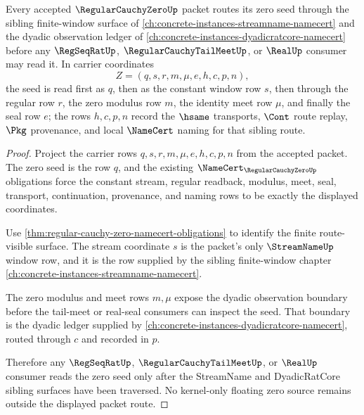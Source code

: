 \begin{theorem}
\label{thm:regular-cauchy-zero-streamname-dyadic-sibling-route}
Every accepted $\RegularCauchyZeroUp$ packet routes its zero seed through the sibling finite-window surface of \autoref{ch:concrete-instances-streamname-namecert} and the dyadic observation ledger of \autoref{ch:concrete-instances-dyadicratcore-namecert} before any $\RegSeqRatUp$, $\RegularCauchyTailMeetUp$, or $\RealUp$ consumer may read it. In carrier coordinates
$$
Z=(q,s,r,m,\mu,e,h,c,p,n),
$$
the seed is read first as $q$, then as the constant window row $s$, then through the regular row $r$, the zero modulus row $m$, the identity meet row $\mu$, and finally the seal row $e$; the rows $h,c,p,n$ record the $\hsame$ transports, $\Cont$ route replay, $\Pkg$ provenance, and local $\NameCert$ naming for that sibling route.
\end{theorem}
\begin{proof}
Project the carrier rows $q,s,r,m,\mu,e,h,c,p,n$ from the accepted packet. The zero seed is the row $q$, and the existing $\NameCert_{\RegularCauchyZeroUp}$ obligations force the constant stream, regular readback, modulus, meet, seal, transport, continuation, provenance, and naming rows to be exactly the displayed coordinates.

Use \autoref{thm:regular-cauchy-zero-namecert-obligations} to identify the finite route-visible surface. The stream coordinate $s$ is the packet's only $\StreamNameUp$ window row, and it is the row supplied by the sibling finite-window chapter \autoref{ch:concrete-instances-streamname-namecert}.

The zero modulus and meet rows $m,\mu$ expose the dyadic observation boundary before the tail-meet or real-seal consumers can inspect the seed. That boundary is the dyadic ledger supplied by \autoref{ch:concrete-instances-dyadicratcore-namecert}, routed through $c$ and recorded in $p$.

Therefore any $\RegSeqRatUp$, $\RegularCauchyTailMeetUp$, or $\RealUp$ consumer reads the zero seed only after the StreamName and DyadicRatCore sibling surfaces have been traversed. No kernel-only floating zero source remains outside the displayed packet route.
\end{proof}

